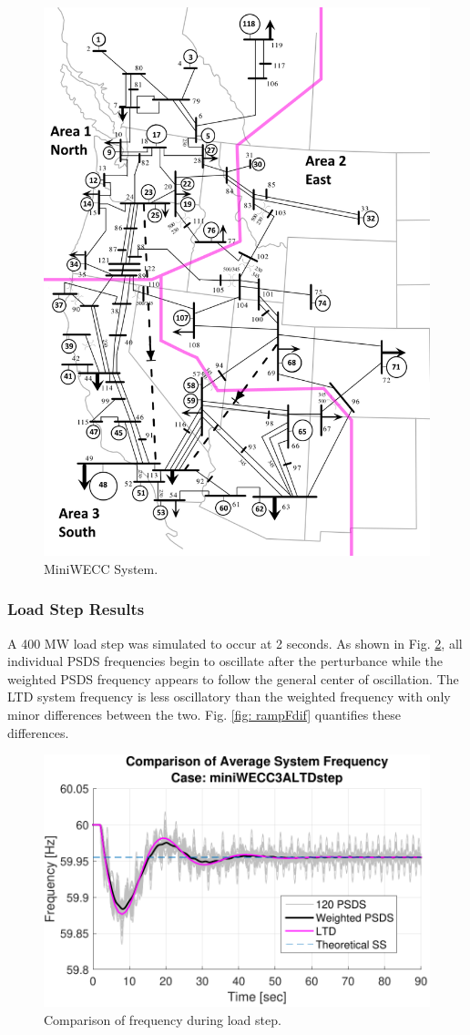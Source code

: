 \begin{figure}[!ht]
	\centering
	\includegraphics[width=.65\linewidth]{figures/miniWECC_split03}
	\caption{MiniWECC System.}
	\label{fig: miniWECC}
\end{figure}

\subsubsection{Load Step Results}
A 400 MW load step was simulated to occur at 2 seconds.
As shown in Fig. \ref{fig: stepFcomp}, all individual PSDS frequencies begin to oscillate after the perturbance while the weighted PSDS frequency appears to follow the general center of oscillation. The LTD system frequency is less oscillatory than the weighted frequency with only minor differences between the two. Fig. \ref{fig: rampFdif} quantifies these differences.

\begin{figure}[!t]
	\centering
	\includegraphics[width=\linewidth]{figures/miniWECC3ALTDstepF3}
	\caption{Comparison of frequency during load step.}
	\label{fig: stepFcomp}
\end{figure}

